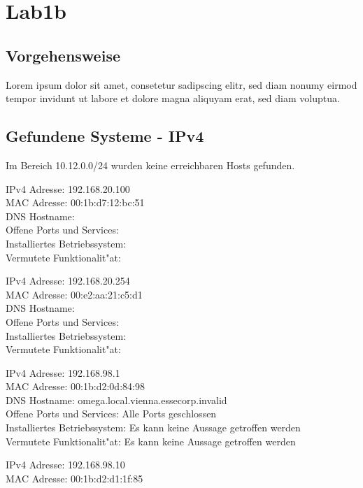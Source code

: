 \documentclass[12pt,a4paper,titlepage,oneside]{scrartcl}
\begin{document}
\section{Lab1b}

\subsection{Vorgehensweise}
Lorem ipsum dolor sit amet, consetetur sadipscing elitr, sed diam nonumy eirmod tempor invidunt ut labore et dolore magna aliquyam erat, sed diam voluptua. 

\subsection{Gefundene Systeme - IPv4}
\begin{description}
\item
Im Bereich 10.12.0.0/24 wurden keine erreichbaren Hosts gefunden.
\item
IPv4 Adresse: 192.168.20.100\\
MAC Adresse: 00:1b:d7:12:bc:51\\
DNS Hostname:\\
Offene Ports und Services:\\
Installiertes Betriebssystem:\\
Vermutete Funktionalit"at:\\
\item
IPv4 Adresse: 192.168.20.254\\
MAC Adresse: 00:e2:aa:21:c5:d1\\
DNS Hostname: \\
Offene Ports und Services:\\
Installiertes Betriebssystem:\\
Vermutete Funktionalit"at:\\
\item
IPv4 Adresse: 192.168.98.1\\
MAC Adresse: 00:1b:d2:0d:84:98\\
DNS Hostname: omega.local.vienna.essecorp.invalid\\
Offene Ports und Services: Alle Ports geschlossen
\\
Installiertes Betriebssystem: Es kann keine Aussage getroffen werden\\
Vermutete Funktionalit"at: Es kann keine Aussage getroffen werden\\
\item
IPv4 Adresse: 192.168.98.10\\
MAC Adresse: 00:1b:d2:d1:1f:85\\

\end{description}
\end{document}
